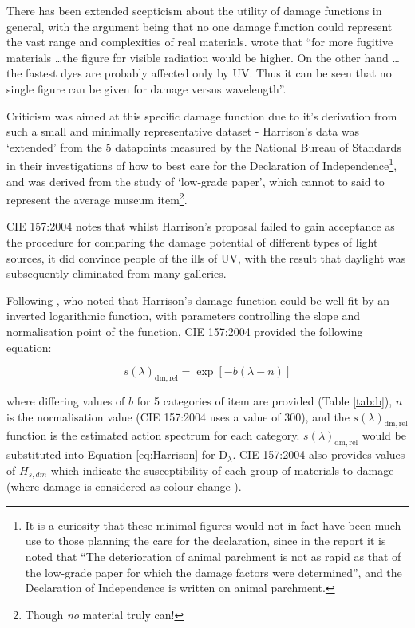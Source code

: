 There has been extended scepticism about the utility of damage functions in general, with the argument being that no one damage function could represent the vast range and complexities of real materials. \citet[p. 178]{thomson_museum_1978} wrote that ``for more fugitive materials \dots the figure for visible radiation would be higher. On the other hand \dots the fastest dyes are probably affected only by UV. Thus it can be seen that no single figure can be given for damage versus wavelength''.

Criticism was aimed at this specific damage function due to it's derivation from such a small and minimally representative dataset - Harrison's data was `extended' from the 5 datapoints measured by the National Bureau of Standards \citep{noauthor_preservation_1951} in their investigations of how to best care for the Declaration of Independence\footnote{It is a curiosity that these minimal figures would not in fact have been much use to those planning the care for the declaration, since in the report it is noted that ``The deterioration of animal parchment is not as rapid as that of the low-grade paper for which the damage factors were determined''\citep{noauthor_preservation_1951}, and the Declaration of Independence is written on animal parchment.}, and was derived from the study of `low-grade paper', which cannot to said to represent the average museum item\footnote{Though \emph{no} material truly can!}.

CIE 157:2004 \citep{cie_cie_2004} notes that whilst Harrison's proposal failed to gain acceptance as the procedure for comparing the damage potential of different types of light sources, it did convince people of the ills of \gls{UV}, with the result that daylight was subsequently eliminated from many galleries.

Following \citet{cuttle_lighting_1988}, who noted that Harrison's damage function could be well fit by an inverted logarithmic function, with parameters controlling the slope and normalisation point of the function, CIE 157:2004 provided the following equation:

\begin{equation}
    s(\lambda)_{\mathrm{dm,rel}}=\exp [-b(\lambda-n)]
\end{equation}

where differing values of $b$ for 5 categories of item are provided (Table \ref{tab:b}), $n$ is the normalisation value (CIE 157:2004 uses a value of 300), and the $s(\lambda)_{\mathrm{dm,rel}}$ function is the estimated action spectrum for each category. $s(\lambda)_{\mathrm{dm,rel}}$ would be substituted into Equation \ref{eq:Harrison} for $\mathrm{D}_{\lambda}$. CIE 157:2004 also provides values of $H_{s,dm}$ which indicate the susceptibility of each group of materials to damage (where damage is considered as colour change%
).

